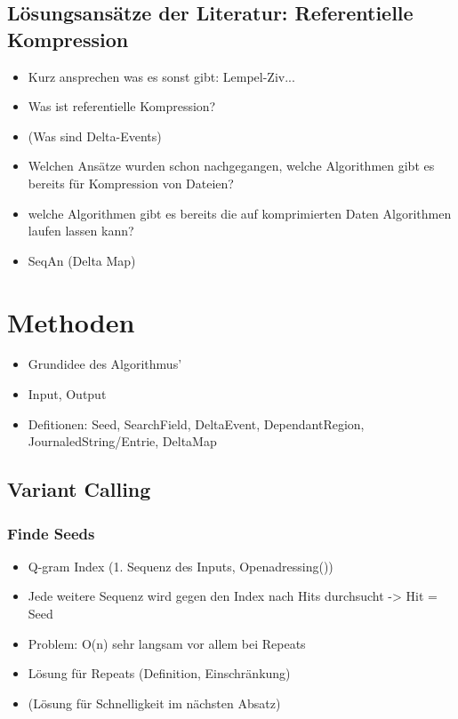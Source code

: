 \documentclass[11pt]{article}
\begin{document}
\subsection{Lösungsansätze der Literatur: Referentielle Kompression}
\begin{itemize}
\item Kurz ansprechen was es sonst gibt: Lempel-Ziv...
\item Was ist referentielle Kompression?
\item (Was sind Delta-Events)
\item Welchen Ansätze wurden schon nachgegangen, welche Algorithmen gibt es bereits für Kompression von Dateien?
\item welche Algorithmen gibt es bereits die auf komprimierten Daten Algorithmen laufen lassen kann?
\item SeqAn (Delta Map)
\end{itemize}

\section{Methoden}
\begin{itemize}
\item Grundidee des Algorithmus'
\item Input, Output
\item Defitionen: Seed, SearchField, DeltaEvent, DependantRegion, JournaledString/Entrie, DeltaMap
\end{itemize}
\subsection{Variant Calling}
\subsubsection{Finde Seeds}
\begin{itemize}
\item Q-gram Index (1. Sequenz des Inputs, Openadressing())
\item Jede weitere Sequenz wird gegen den Index nach Hits durchsucht -> Hit = Seed
\item Problem: O(n) sehr langsam vor allem bei Repeats
\item Lösung für Repeats (Definition, Einschränkung)
\item (Lösung für Schnelligkeit im nächsten Absatz)
\end{itemize}
\end{document}
